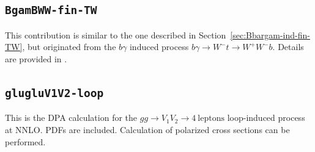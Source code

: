 \documentclass[english,12pt]{article}
\newcommand{\sect}[1]{Section~\ref{#1}}
\begin{document}
\subsection{\tt BgamBWW-fin-TW}
\label{sec:Bgam-ind-fin-TW}
This contribution is similar to the one described in \sect{sec:Bbargam-ind-fin-TW}, but originated 
from the $b\gamma$ induced process $b\gamma \to W^- t \to W^+W^-b$.
Details are provided in \cite{Dao:2024ffg}.
\subsection{\tt glugluV1V2-loop}
\label{sec:DPA-loop-gg}
This is the DPA calculation for the $gg \to V_1 V_2 \to 4\ \text{leptons}$ loop-induced process at NNLO. 
PDFs are included. Calculation of polarized cross sections can be performed.
\newpage


\end{document}
